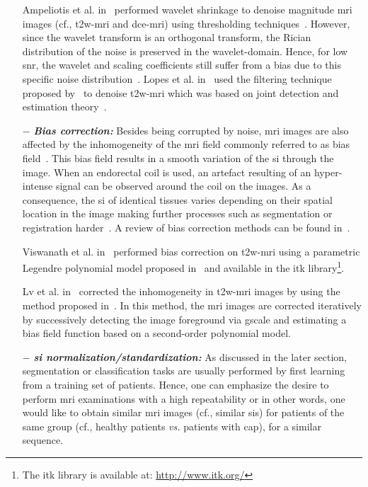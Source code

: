 \begin{enumerate}[leftmargin=*]
Ampeliotis et al. in~\cite{Ampeliotis2007,Ampeliotis2008} performed wavelet shrinkage to denoise magnitude \ac{mri} images (cf., \ac{t2w}-\ac{mri} and \ac{dce}-\ac{mri}) using thresholding techniques~\cite{Mallat2008}. However, since the wavelet transform is an orthogonal transform, the Rician distribution of the noise is preserved in the wavelet-domain. Hence, for low \ac{snr}, the wavelet and scaling coefficients still suffer from a bias due to this specific noise distribution~\cite{Nowak1999}. 
Lopes et al. in~\cite{Lopes2011} used the filtering technique proposed by~\cite{Pizurica2003} to denoise \ac{t2w}-\ac{mri} which was based on joint detection and estimation theory~\cite{Middleton1968}.

\item[$-$] \textbf{\textit{Bias correction:}} Besides being corrupted by noise, \ac{mri} images are also affected by the inhomogeneity of the \ac{mri} field commonly referred to as bias field~\cite{Styner2000}. This bias field results in a smooth variation of the \ac{si} through the image. When an endorectal coil is used, an artefact resulting of an hyper-intense signal can be observed around the coil on the images. As a consequence, the \ac{si} of identical tissues varies depending on their spatial location in the image making further processes such as segmentation or registration harder~\cite{Jungke1987,Vovk2007}. A review of bias correction methods can be found in~\cite{Vovk2007}.

  Viswanath et al. in~\cite{Viswanath2009} performed bias correction on \ac{t2w}-\ac{mri} using a parametric Legendre polynomial model proposed in~\cite{Styner2000} and available in the \ac{itk} library\footnote{The \ac{itk} library is available at: \url{http://www.itk.org/}}.

  Lv et al. in~\cite{Lv2009} corrected the inhomogeneity in \ac{t2w}-\ac{mri} images by using the method proposed in~\cite{Madabhushi2006}. In this method, the \ac{mri} images are corrected iteratively by successively detecting the image foreground via \ac{gscale} and estimating a bias field function based on a second-order polynomial model.

\item[$-$] \textbf{\textit{\Ac{si} normalization/standardization:}} As discussed in the later section, segmentation or classification tasks are usually performed by first learning from a training set of patients. Hence, one can emphasize the desire to perform \ac{mri} examinations with a high repeatability or in other words, one would like to obtain similar \ac{mri} images (cf., similar \acp{si}) for patients of the same group (cf., healthy patients \textit{vs.} patients with \ac{cap}), for a similar sequence.


\end{enumerate}
